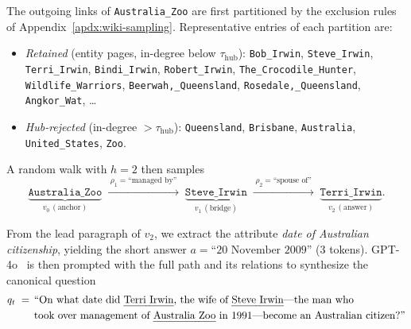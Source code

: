 The outgoing links of \texttt{Australia\_Zoo} are first partitioned by the exclusion rules of Appendix~\ref{apdx:wiki-sampling}. Representative entries of each partition are:
\begin{itemize}[leftmargin=*,itemsep=1pt,topsep=1pt]
    \item \emph{Retained} (entity pages, in-degree below $\tau_\text{hub}$): \texttt{Bob\_Irwin}, \texttt{Steve\_Irwin}, \texttt{Terri\_Irwin}, \texttt{Bindi\_Irwin}, \texttt{Robert\_Irwin}, \texttt{The\_Crocodile\_Hunter}, \texttt{Wildlife\_Warriors}, \texttt{Beerwah,\_Queensland}, \texttt{Rosedale,\_Queensland}, \texttt{Angkor\_Wat}, \dots
    \item \emph{Hub-rejected} (in-degree $>\tau_\text{hub}$): \texttt{Queensland}, \texttt{Brisbane}, \texttt{Australia}, \texttt{United\_States}, \texttt{Zoo}.
\end{itemize}
A random walk with $h=2$ then samples
\begin{equation*}
    \underbrace{\texttt{Australia\_Zoo}}_{v_0\,(\text{anchor})}\; \xrightarrow{\;\rho_1=\text{``managed by''}\;}\; \underbrace{\texttt{Steve\_Irwin}}_{v_1\,(\text{bridge})}\; \xrightarrow{\;\rho_2=\text{``spouse of''}\;}\; \underbrace{\texttt{Terri\_Irwin}}_{v_2\,(\text{answer})}.
\end{equation*}


From the lead paragraph of $v_2$, we extract the attribute \emph{date of Australian citizenship}, yielding the short answer $a=\text{``20 November 2009''}$ (3 tokens). GPT-4o~\citep{openai2024gpt4ocard} is then prompted with the full path and its relations to synthesize the canonical question
\begin{equation*}
\begin{aligned}
q_t \;=\;\, &\text{``On what date did \emph{Terri Irwin}, the wife of \emph{Steve Irwin}---the man who}\\
            &\text{took over management of \emph{Australia Zoo} in 1991---become an Australian citizen?''}
\end{aligned}
\end{equation*}


